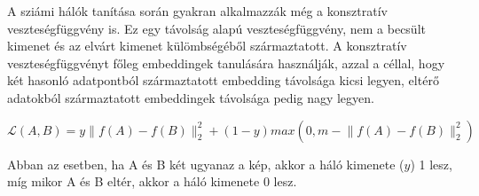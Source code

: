 



A sziámi hálók tanítása során gyakran alkalmazzák még a konsztratív veszteségfüggvény is. Ez egy távolság alapú veszteségfüggvény, nem a becsült kimenet és az elvárt kimenet külömbségéből származtatott. A konsztratív veszteségfüggvényt főleg embeddingek tanulására használják, azzal a céllal, hogy két hasonló adatpontból származtatott embedding távolsága kicsi legyen, eltérő adatokból származtatott embeddingek távolsága pedig nagy legyen. 

\[ \mathcal{L}(A,B) = y \lVert f(A) - f(B)\rVert_2^2 + (1-y) max\left(0,m - \lVert f(A) - f(B) \rVert_2^2 \right) \]

Abban az esetben, ha A és B két ugyanaz a kép, akkor a háló kimenete ($y$) 1 lesz, míg mikor A és B eltér, akkor a háló kimenete 0 lesz. 